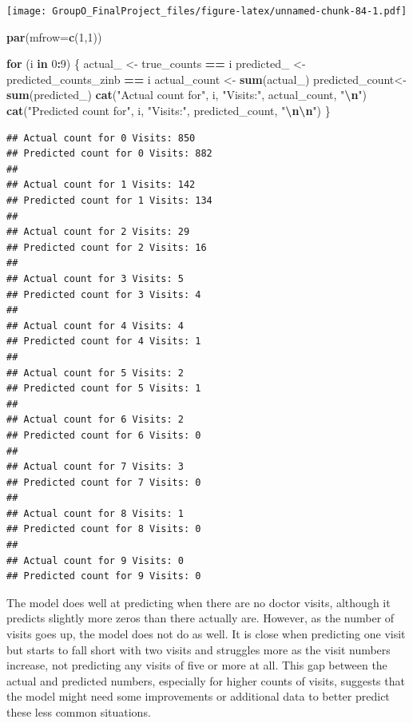 \documentclass[
]{article}
\newenvironment{Shaded}{\begin{snugshade}}{\end{snugshade}}
\newcommand{\AttributeTok}[1]{\textcolor[rgb]{0.13,0.29,0.53}{#1}}
\newcommand{\ControlFlowTok}[1]{\textcolor[rgb]{0.13,0.29,0.53}{\textbf{#1}}}
\newcommand{\DecValTok}[1]{\textcolor[rgb]{0.00,0.00,0.81}{#1}}
\newcommand{\FunctionTok}[1]{\textcolor[rgb]{0.13,0.29,0.53}{\textbf{#1}}}
\newcommand{\NormalTok}[1]{#1}
\newcommand{\OtherTok}[1]{\textcolor[rgb]{0.56,0.35,0.01}{#1}}
\newcommand{\SpecialCharTok}[1]{\textcolor[rgb]{0.81,0.36,0.00}{\textbf{#1}}}
\newcommand{\StringTok}[1]{\textcolor[rgb]{0.31,0.60,0.02}{#1}}
\begin{document}
\texttt{[image: GroupO\_FinalProject\_files/figure-latex/unnamed-chunk-84-1.pdf]}

\begin{Shaded}
\begin{Highlighting}[]
\FunctionTok{par}\NormalTok{(}\AttributeTok{mfrow=}\FunctionTok{c}\NormalTok{(}\DecValTok{1}\NormalTok{,}\DecValTok{1}\NormalTok{))}


\ControlFlowTok{for}\NormalTok{ (i }\ControlFlowTok{in} \DecValTok{0}\SpecialCharTok{:}\DecValTok{9}\NormalTok{) \{}
\NormalTok{  actual\_ }\OtherTok{\textless{}{-}}\NormalTok{ true\_counts }\SpecialCharTok{==}\NormalTok{ i}
\NormalTok{  predicted\_ }\OtherTok{\textless{}{-}}\NormalTok{ predicted\_counts\_zinb }\SpecialCharTok{==}\NormalTok{ i}
\NormalTok{  actual\_count }\OtherTok{\textless{}{-}} \FunctionTok{sum}\NormalTok{(actual\_)}
\NormalTok{  predicted\_count}\OtherTok{\textless{}{-}} \FunctionTok{sum}\NormalTok{(predicted\_)}
  \FunctionTok{cat}\NormalTok{(}\StringTok{"Actual count for"}\NormalTok{, i, }\StringTok{"Visits:"}\NormalTok{, actual\_count, }\StringTok{"}\SpecialCharTok{\textbackslash{}n}\StringTok{"}\NormalTok{)}
  \FunctionTok{cat}\NormalTok{(}\StringTok{"Predicted count for"}\NormalTok{, i, }\StringTok{"Visits:"}\NormalTok{, predicted\_count, }\StringTok{"}\SpecialCharTok{\textbackslash{}n\textbackslash{}n}\StringTok{"}\NormalTok{)}
\NormalTok{\}}
\end{Highlighting}
\end{Shaded}

\begin{verbatim}
## Actual count for 0 Visits: 850 
## Predicted count for 0 Visits: 882 
## 
## Actual count for 1 Visits: 142 
## Predicted count for 1 Visits: 134 
## 
## Actual count for 2 Visits: 29 
## Predicted count for 2 Visits: 16 
## 
## Actual count for 3 Visits: 5 
## Predicted count for 3 Visits: 4 
## 
## Actual count for 4 Visits: 4 
## Predicted count for 4 Visits: 1 
## 
## Actual count for 5 Visits: 2 
## Predicted count for 5 Visits: 1 
## 
## Actual count for 6 Visits: 2 
## Predicted count for 6 Visits: 0 
## 
## Actual count for 7 Visits: 3 
## Predicted count for 7 Visits: 0 
## 
## Actual count for 8 Visits: 1 
## Predicted count for 8 Visits: 0 
## 
## Actual count for 9 Visits: 0 
## Predicted count for 9 Visits: 0
\end{verbatim}

The model does well at predicting when there are no doctor visits,
although it predicts slightly more zeros than there actually are.
However, as the number of visits goes up, the model does not do as well.
It is close when predicting one visit but starts to fall short with two
visits and struggles more as the visit numbers increase, not predicting
any visits of five or more at all. This gap between the actual and
predicted numbers, especially for higher counts of visits, suggests that
the model might need some improvements or additional data to better
predict these less common situations.
\end{document}
